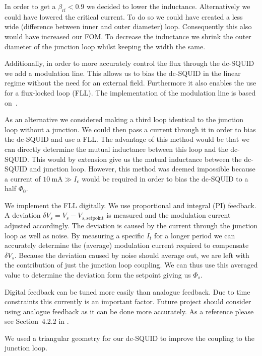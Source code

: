 In order to get a $\beta_{\text{rf}} < 0.9$ we decided to lower the inductance. Alternatively we could have lowered the critical current. To do so we could have created a less wide (difference between inner and outer diameter) loop. Consequently this also would have increased our FOM. To decrease the inductance we shrink the outer diameter of the junction loop whilst keeping the width the same.

Additionally, in order to more accurately control the flux through the dc-SQUID we add a modulation line. This allows us to bias the dc-SQUID in the linear regime without the need for an external field. Furthermore it also enables the use for a flux-locked loop (FLL). The implementation of the modulation line is based on~\cite{linYBaCuNano2020}.

As an alternative we considered making a third loop identical to the junction loop without a junction. We could then pass a current through it in order to bias the dc-SQUID and use a FLL. The advantage of this method would be that we can directly determine the mutual inductance between this loop and the dc-SQUID. This would by extension give us the mutual inductance between the dc-SQUID and junction loop. However, this method was deemed impossible because a current of $\qty{10}{\milli\ampere} \gg I_c$ would be required in order to bias the dc-SQUID to a half $\Phi_0$.

We implement the FLL digitally. We use proportional and integral (PI) feedback. A deviation $\delta V_s = V_s - V_{s,\text{setpoint}}$ is measured and the modulation current adjusted accordingly. The deviation is caused by the current through the junction loop as well as noise. By measuring a specific $I_t$ for a longer period we can accurately determine the (average) modulation current required to compensate $\delta V_s$. Because the deviation caused by noise should average out, we are left with the contribution of just the junction loop coupling. We can thus use this averaged value to determine the deviation form the setpoint giving us $\Phi_s$.

Digital feedback can be tuned more easily than analogue feedback. Due to time constraints this currently is an important factor. Future project should consider using analogue feedback as it can be done more accurately. As a reference please see Section~4.2.2 in \cite{zhangSQUIDReadoutElectronics2020}.

We used a triangular geometry for our dc-SQUID to improve the coupling to the junction loop.

